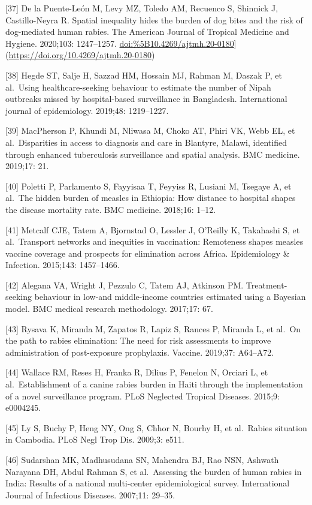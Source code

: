 \documentclass[
  oneside]{book}
\begin{document}
{[}37{]} De la Puente-León M, Levy MZ, Toledo AM, Recuenco S, Shinnick J,
Castillo-Neyra R. Spatial inequality hides the burden of dog bites and
the risk of dog-mediated human rabies. The American Journal of Tropical
Medicine and Hygiene. 2020;103: 1247--1257.
\url{doi:\%5B10.4269/ajtmh.20-0180}{]}(\url{https://doi.org/10.4269/ajtmh.20-0180})

{[}38{]} Hegde ST, Salje H, Sazzad HM, Hossain MJ, Rahman M, Daszak P, et
al.~Using healthcare-seeking behaviour to estimate the number of Nipah
outbreaks missed by hospital-based surveillance in Bangladesh.
International journal of epidemiology. 2019;48: 1219--1227.

{[}39{]} MacPherson P, Khundi M, Nliwasa M, Choko AT, Phiri VK, Webb EL, et
al.~Disparities in access to diagnosis and care in Blantyre, Malawi,
identified through enhanced tuberculosis surveillance and spatial
analysis. BMC medicine. 2019;17: 21.

{[}40{]} Poletti P, Parlamento S, Fayyisaa T, Feyyiss R, Lusiani M, Tsegaye
A, et al.~The hidden burden of measles in Ethiopia: How distance to
hospital shapes the disease mortality rate. BMC medicine. 2018;16:
1--12.

{[}41{]} Metcalf CJE, Tatem A, Bjornstad O, Lessler J, O'Reilly K, Takahashi
S, et al.~Transport networks and inequities in vaccination: Remoteness
shapes measles vaccine coverage and prospects for elimination across
Africa. Epidemiology \& Infection. 2015;143: 1457--1466.

{[}42{]} Alegana VA, Wright J, Pezzulo C, Tatem AJ, Atkinson PM.
Treatment-seeking behaviour in low-and middle-income countries estimated
using a Bayesian model. BMC medical research methodology. 2017;17: 67.

{[}43{]} Rysava K, Miranda M, Zapatos R, Lapiz S, Rances P, Miranda L, et
al.~On the path to rabies elimination: The need for risk assessments to
improve administration of post-exposure prophylaxis. Vaccine. 2019;37:
A64--A72.

{[}44{]} Wallace RM, Reses H, Franka R, Dilius P, Fenelon N, Orciari L, et
al.~Establishment of a canine rabies burden in Haiti through the
implementation of a novel surveillance program. PLoS Neglected Tropical
Diseases. 2015;9: e0004245.

{[}45{]} Ly S, Buchy P, Heng NY, Ong S, Chhor N, Bourhy H, et al.~Rabies
situation in Cambodia. PLoS Negl Trop Dis. 2009;3: e511.

{[}46{]} Sudarshan MK, Madhusudana SN, Mahendra BJ, Rao NSN, Ashwath
Narayana DH, Abdul Rahman S, et al.~Assessing the burden of human rabies
in India: Results of a national multi-center epidemiological survey.
International Journal of Infectious Diseases. 2007;11: 29--35.
\end{document}
